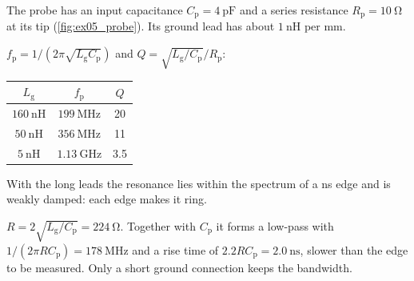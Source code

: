 

The probe has an input capacitance $C_\mathrm{p}=\SI{4}{\pico\farad}$ and a series resistance $R_\mathrm{p}=\SI{10}{\ohm}$ at its tip (\autoref{fig:ex05_probe}). Its ground lead has about $\SI{1}{\nano\henry}$ per mm.




\begin{solutionblock}
	$f_\mathrm{p}=1/(2\pi\sqrt{L_\mathrm{g}C_\mathrm{p}})$ and $Q=\sqrt{L_\mathrm{g}/C_\mathrm{p}}/R_\mathrm{p}$:
	\begin{solutiontable}[ht]
		\centering
		\begin{tabular}{|c|c|c|}
			\hline
			$L_\mathrm{g}$            & $f_\mathrm{p}$                   & $Q$  \\
			\hline
			$\SI{160}{\nano\henry}$   & $\SI{199}{\mega\hertz}$          & 20   \\
			$\SI{50}{\nano\henry}$    & $\SI{356}{\mega\hertz}$          & 11   \\
			$\SI{5}{\nano\henry}$     & $\SI{1.13}{\giga\hertz}$         & 3.5  \\
			\hline
		\end{tabular}
		\caption{Resonance of the probe circuit}
	\end{solutiontable}
	With the long leads the resonance lies within the spectrum of a ns edge and is weakly damped: each edge makes it ring.
\end{solutionblock}


\begin{solutionblock}
	$R=2\sqrt{L_\mathrm{g}/C_\mathrm{p}}=\SI{224}{\ohm}$. Together with $C_\mathrm{p}$ it forms a low-pass with $1/(2\pi RC_\mathrm{p})=\SI{178}{\mega\hertz}$ and a rise time of $2.2RC_\mathrm{p}=\SI{2.0}{\nano\second}$, slower than the edge to be measured. Only a short ground connection keeps the bandwidth.
\end{solutionblock}

